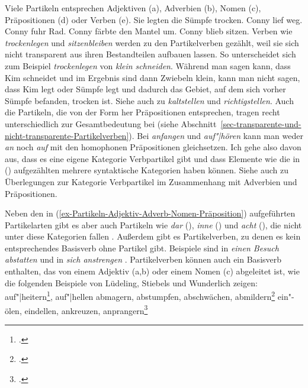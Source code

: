 Viele Partikeln entsprechen Adjektiven (a), Adverbien (b), Nomen (c), 
Präpositionen (d) oder Verben (e).
\eal
\label{ex-Partikeln-Adjektiv-Adverb-Nomen-Präposition}
\ex{}
Sie legten die Sümpfe trocken.
\ex{}
Conny lief weg.
\ex{}
Conny fuhr Rad.
\ex{}
Conny färbte den Mantel um.
\ex{}
Conny blieb sitzen.
\zl
%
Verben wie \emph{trockenlegen} und \emph{sitzenbleiben} werden zu den Partikelverben gezählt, weil sie sich nicht transparent
aus ihren Bestandteilen aufbauen lassen. So unterscheidet sich zum Beispiel \emph{trockenlegen} von
\emph{klein schneiden}. Während man sagen kann, dass Kim schneidet und im Ergebnis sind dann
Zwiebeln klein, kann man nicht sagen, dass Kim legt oder Sümpfe legt und dadurch das Gebiet, auf dem
sich vorher Sümpfe befanden, trocken ist. Siehe auch  zu \emph{kaltstellen}
und \emph{richtigstellen}. Auch die Partikeln, die von der Form her Präpositionen entsprechen,
tragen recht unterschiedlich zur Gesamtbedeutung bei (siehe
Abschnitt~\ref{sec-transparente-und-nicht-transparente-Partikelverben}). Bei \emph{anfangen} und
\emph{auf"|hören} kann man weder \emph{an} noch \emph{auf} mit den homophonen Präpositionen
gleichsetzen. Ich gehe also davon aus, dass es eine eigene Kategorie Verbpartikel gibt und dass
Elemente wie die in () aufgezählten mehrere syntaktische Kategorien haben können. Siehe auch
 zu Überlegungen zur Kategorie Verbpartikel im Zusammenhang mit Adverbien und Präpositionen.
\largerpage

Neben den in (\ref{ex-Partikeln-Adjektiv-Adverb-Nomen-Präposition}) aufgeführten Partikelarten gibt es aber auch Partikeln wie \emph{dar} (), 
\emph{inne} () und \emph{acht} 
(), die nicht unter diese Kategorien fallen \citep[89]{Uszkoreit87a}.
Außerdem gibt es Partikelverben, zu denen es kein entsprechendes Basisverb ohne
Partikel gibt. Beispiele sind  in \emph{einen Besuch abstatten} und 
 in \emph{sich anstrengen} \citep[4]{DeKuthy1994a}. Partikelverben können
auch ein Basisverb enthalten, das von einem Adjektiv (a,b) oder einem Nomen (c)
abgeleitet ist, wie die folgenden Beispiele von Lüdeling, Stiebels und Wunderlich zeigen:
\eal
\ex auf"|heitern\footnote{
\citet[69]{Luedeling2001a}.
}, auf"|hellen
\ex abmagern, abstumpfen, abschwächen, abmildern\footnote{
  \citet[216]{Stiebels96a}.
}
\ex ein"-ölen, eindellen, ankreuzen, anprangern\footnote{
\citet[]{SW92}.
}
\zl

